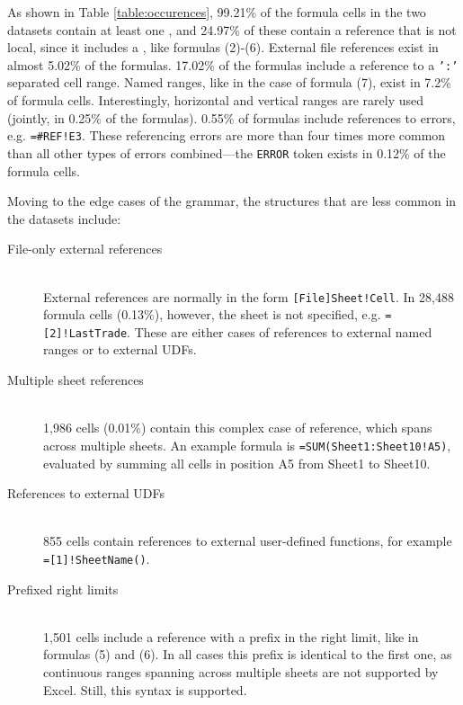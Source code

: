 \documentclass[conference]{IEEEtran}
\begin{document}
As shown in Table \ref{table:occurences}, 99.21\% of the formula cells in the two datasets contain at least one , and 24.97\% of these contain a reference that is not local, since it includes a , like formulas (2)-(6). External file references exist in almost 5.02\% of the formulas. 17.02\% of the formulas include a reference to a \texttt{':'} separated cell range. Named ranges, like in the case of formula (7), exist in 7.2\% of formula cells. Interestingly, horizontal and vertical ranges are rarely used (jointly, in 0.25\% of the formulas). 0.55\% of formulas include references to errors, e.g. \texttt{=\#REF!E3}. These referencing errors are more than four times more common than all other types of errors combined---the \texttt{ERROR} token exists in 0.12\% of the formula cells.

Moving to the edge cases of the grammar, the structures that are less common in the datasets include:
\begin{description}
	\item[File-only external references] \hfill \\
	External references are normally in the form \texttt{[File]Sheet!Cell}. In 28,488 formula cells (0.13\%), however, the sheet is not specified, e.g. \texttt{=[2]!LastTrade}. These are either cases of references to external named ranges or to external UDFs.
	\item[Multiple sheet references] \hfill \\
	1,986 cells (0.01\%) contain this complex case of reference, which spans across multiple sheets. An example formula is \texttt{=SUM(Sheet1:Sheet10!A5)}, evaluated by summing all cells in position A5 from Sheet1 to Sheet10.
	\item[References to external UDFs] \hfill \\
	855 cells contain references to external user-defined functions, for example \texttt{=[1]!SheetName()}.
	\item[Prefixed right limits] \hfill \\
	1,501 cells include a reference with a prefix in the right limit, like in formulas (5) and (6). In all cases this prefix is identical to the first one, as continuous ranges spanning across multiple sheets are not supported by Excel. Still, this syntax is supported.
\end{description}
\end{document}
